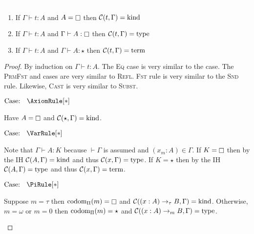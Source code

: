 


\begin{theorem}
    \textcolor{white}{\_}
    \begin{enumerate}
        \item If $\Gamma \vdash t : A$ and $A = \kind$ then $\mathcal{C}(t, \Gamma) = \mbox{\normalfont kind}$
        \item If $\Gamma \vdash t : A$ and $\Gamma \vdash A : \kind$ then $\mathcal{C}(t, \Gamma) = \mbox{\normalfont type}$
        \item If $\Gamma \vdash t : A$ and $\Gamma \vdash A : \star$ then $\mathcal{C}(t, \Gamma) = \mbox{\normalfont term}$
    \end{enumerate}
\end{theorem}
\begin{proof}
    By induction on $\Gamma \vdash t : A$.
    The \textsc{Eq} case is very similar to the  case.
    The \textsc{PrmFst} and  cases are very similar to \textsc{Refl}.
    \textsc{Fst} rule is very similar to the \textsc{Snd} rule.
    Likewise, \textsc{Cast} is very similar to \textsc{Subst}.

    $\text{Case: }\begin{array}{c} \AxiomRule[*] \end{array}$
    \begin{proofcase}
        Have $A = \kind$ and $\mathcal{C}(\star, \Gamma) = \mbox{\normalfont kind}$.
    \end{proofcase}

    $\text{Case: }\begin{array}{c} \VarRule[*] \end{array}$
    \begin{proofcase}
        Note that $\Gamma \vdash A : K$ because $\vdash \Gamma$ is assumed and $(x_m : A) \in \Gamma$.
        If $K = \kind$ then by the IH $\mathcal{C}(A, \Gamma) = \mbox{\normalfont kind}$ and thus $\mathcal{C}(x, \Gamma) = \mbox{\normalfont type}$.
        If $K = \star$ then by the IH $\mathcal{C}(A, \Gamma) = \mbox{\normalfont type}$ and thus $\mathcal{C}(x, \Gamma) = \mbox{\normalfont term}$.
    \end{proofcase}

    $\text{Case: }\begin{array}{c} \PiRule[*] \end{array}$
    \begin{proofcase}
        Suppose $m = \tau$ then $\pcodom(m) = \kind$ and $\mathcal{C}((x : A) \to_\tau B, \Gamma) = \mbox{\normalfont kind}$.
        Otherwise, $m = \omega$ or $m = 0$ then $\mbox{\normalfont codom}_\Pi(m) = \star$ and $\mathcal{C}((x : A) \to_m B, \Gamma) = \mbox{\normalfont type}$.
    \end{proofcase}


\end{proof}
